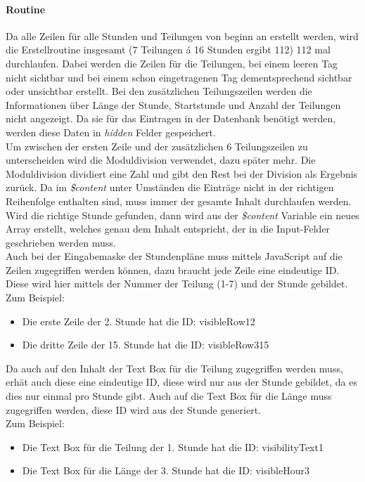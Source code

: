 \paragraph{Routine}
Da alle Zeilen für alle Stunden und Teilungen von beginn an erstellt werden, wird die Erstellroutine insgesamt (7 Teilungen \'{a} 16 Stunden ergibt 112) 112 mal durchlaufen. Dabei werden die Zeilen für die Teilungen, bei einem leeren Tag nicht sichtbar und bei einem schon eingetragenen Tag dementsprechend sichtbar oder unsichtbar erstellt. Bei den zusätzlichen Teilungszeilen werden die Informationen über Länge der Stunde, Startstunde und Anzahl der Teilungen nicht angezeigt. Da sie für das Eintragen in der Datenbank benötigt werden, werden diese Daten in \textit{hidden} Felder gespeichert.\\
Um zwischen der ersten Zeile und der zusätzlichen 6 Teilungszeilen zu unterscheiden wird die Moduldivision verwendet, dazu später mehr. Die Moduldivision dividiert eine Zahl und gibt den Rest bei der Division als Ergebnis zurück. Da im \textit{\$content} unter Umständen die Einträge nicht in der richtigen Reihenfolge enthalten sind, muss immer der gesamte Inhalt durchlaufen werden. Wird die richtige Stunde gefunden, dann wird aus der \textit{\$content} Variable ein neues Array erstellt, welches genau dem Inhalt entspricht, der in die Input-Felder geschrieben werden muss.\\
Auch bei der Eingabemaske der Stundenpläne muss mittels JavaScript auf die Zeilen zugegriffen werden können, dazu braucht jede Zeile eine eindeutige ID. Diese wird hier mittels der Nummer der Teilung (1-7) und der Stunde gebildet.\\ 
Zum Beispiel:
\begin{itemize}
	\item Die erste Zeile der 2. Stunde hat die ID: visibleRow12
	\item Die dritte Zeile der 15. Stunde hat die ID: visibleRow315
\end{itemize}
Da auch auf den Inhalt der Text Box für die Teilung zugegriffen werden muss, erhät auch diese eine eindeutige ID, diese wird nur aus der Stunde gebildet, da es dies nur einmal pro Stunde gibt. Auch auf die Text Box für die Länge muss zugegriffen werden, diese ID wird aus der Stunde generiert.\\
Zum Beispiel:
\begin{itemize}
	\item Die Text Box für die Teilung der 1. Stunde hat die ID: visibilityText1
	\item Die Text Box für die Länge der 3. Stunde hat die ID: visibleHour3
\end{itemize}
